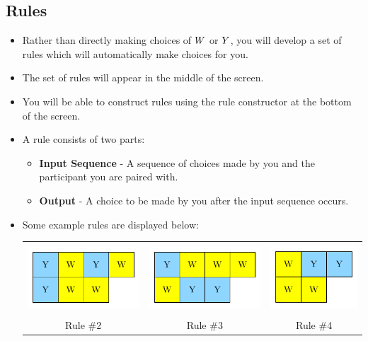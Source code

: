 \documentclass[11pt]{article}
\newcommand{\dblbkt}[1]{}
\begin{document}
\subsection*{\dblbkt{2} Rules}
\begin{itemize} 
\item Rather than directly making choices of $W$ or $Y$, you will develop a set of rules which will automatically make choices for you. 
\item \dblbkt{3} The set of rules will appear in the middle of the screen. 
\item \dblbkt{3} You will be able to construct rules using the rule constructor at the bottom of the screen.
\item \dblbkt{3} A rule consists of two parts:
\begin{itemize} 
\item \dblbkt{1} {\bf Input Sequence} - A sequence of choices made by you and the participant you are paired with. 
\item \dblbkt{2} {\bf Output} - A choice to be made by you after the input sequence occurs. 
\end{itemize} 

\item \dblbkt{2} Some example rules are displayed below:
  
\begin{tabular}{ccc} 
\includegraphics[height=1in]{pictures/rule1.pdf} & 
\includegraphics[height=1in]{pictures/rule7.pdf} & 
\includegraphics[height=1in]{pictures/rule4.pdf} \\ 
Rule \#2 & Rule \#3 & Rule \#4
\end{tabular} 


\end{itemize}
\end{document}
